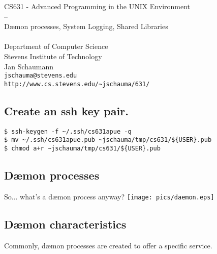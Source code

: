 \documentclass[xga]{xdvislides}
\begin{document}
\setfontphv

\lhead{\slidetitle}
\cfoot{\relax}
\rfoot{\Gray{\today}}

\vspace*{\fill}
\begin{center}
	\Hugesize
		CS631 - Advanced Programming in the UNIX Environment\\
		-- \\
		D\ae mon processes, System Logging, Shared Libraries\\
	\hspace*{5mm}\blueline\\ [1em]
	\Normalsize
		Department of Computer Science\\
		Stevens Institute of Technology\\
		Jan Schaumann\\
		\verb+jschauma@stevens.edu+\\
		\verb+http://www.cs.stevens.edu/~jschauma/631/+
\end{center}
\vspace*{\fill}

\subsection{Create an ssh key pair.}

\vspace{1in}
\begin{verbatim}
$ ssh-keygen -f ~/.ssh/cs631apue -q
$ mv ~/.ssh/cs631apue.pub ~jschauma/tmp/cs631/${USER}.pub
$ chmod a+r ~jschauma/tmp/cs631/${USER}.pub
\end{verbatim}

\subsection{D\ae mon processes}
So... what's a d\ae mon process anyway?
\vfill
\hfill\texttt{[image: pics/daemon.eps]} \\

\subsection{D\ae mon characteristics}
Commonly, d\ae mon processes are created to offer a specific service.
\\
\end{document}
